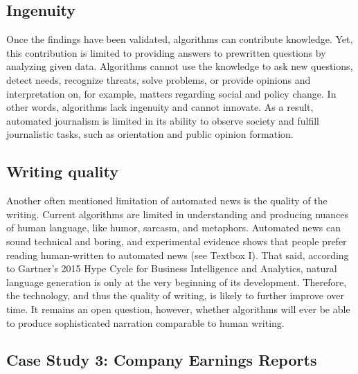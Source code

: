 \documentclass[notoc, symmetric, nobib, nols]{towcenter-guideto-book}
\begin{document}
\subsection{Ingenuity}

Once the findings have been validated, algorithms can contribute knowledge. Yet, this contribution is limited to providing answers to prewritten questions by analyzing given data. Algorithms cannot use the knowledge to ask new questions, detect needs, recognize threats, solve problems, or provide opinions and interpretation on, for example, matters regarding social and policy change. In other words, algorithms lack ingenuity and cannot innovate. As a result, automated journalism is limited in its ability to observe society and fulfill journalistic tasks, such as orientation and public opinion formation.\autocite{latar15}  

\subsection{Writing quality}

Another often mentioned limitation of automated news is the quality of the writing. Current algorithms are limited in understanding and producing nuances of human language, like humor, sarcasm, and metaphors. Automated news can sound technical and boring, and experimental evidence shows that people prefer reading human-written to automated news (see Textbox I). That said, according to Gartner's 2015 Hype Cycle for Business Intelligence and Analytics, natural language generation is only at the very beginning of its development.\autocite{schlegel15} Therefore, the technology, and thus the quality of writing, is likely to further improve over time. It remains an open question, however, whether algorithms will ever be able to produce sophisticated narration comparable to human writing.\autocite{latar15}

\subsection{Case Study 3: Company Earnings Reports}
\end{document}
